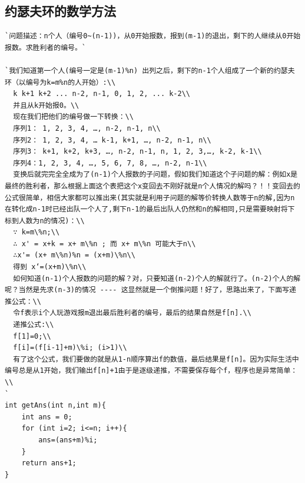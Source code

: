 \documentclass[a4paper]{article}
\begin{document}
\begin{CJK*}{UTF8}{gbsn}
\begin{multicols}{3}
\begin{flushleft}
\subsection{约瑟夫环的数学方法}
\begin{lstlisting}
`问题描述：n个人（编号0~(n-1))，从0开始报数，报到(m-1)的退出，剩下的人继续从0开始报数。求胜利者的编号。`

`我们知道第一个人(编号一定是(m-1)%n) 出列之后，剩下的n-1个人组成了一个新的约瑟夫环（以编号为k=m%n的人开始）:\\
  k k+1 k+2 ... n-2, n-1, 0, 1, 2, ... k-2\\
  并且从k开始报0。\\
  现在我们把他们的编号做一下转换：\\
  序列1： 1, 2, 3, 4, …, n-2, n-1, n\\
  序列2： 1, 2, 3, 4, … k-1, k+1, …, n-2, n-1, n\\
  序列3： k+1, k+2, k+3, …, n-2, n-1, n, 1, 2, 3,…, k-2, k-1\\
  序列4：1, 2, 3, 4, …, 5, 6, 7, 8, …, n-2, n-1\\
  变换后就完完全全成为了(n-1)个人报数的子问题，假如我们知道这个子问题的解：例如x是最终的胜利者，那么根据上面这个表把这个x变回去不刚好就是n个人情况的解吗？！！变回去的公式很简单，相信大家都可以推出来(其实就是利用子问题的解等价转换人数等于n的解,因为n在转化成n-1时已经出队一个人了,剩下n-1的最后出队人仍然和n的解相同,只是需要映射将下标到人数为n的情况)：\\
  ∵ k=m\%n;\\
  ∴ x' = x+k = x+ m\%n ; 而 x+ m\%n 可能大于n\\
  ∴x'= (x+ m\%n)%n = (x+m)\%n\\
  得到 x‘=(x+m)\%n\\
  如何知道(n-1)个人报数的问题的解？对，只要知道(n-2)个人的解就行了。(n-2)个人的解呢？当然是先求(n-3)的情况 ---- 这显然就是一个倒推问题！好了，思路出来了，下面写递推公式：\\
  令f表示i个人玩游戏报m退出最后胜利者的编号，最后的结果自然是f[n].\\
  递推公式:\\
  f[1]=0;\\
  f[i]=(f[i-1]+m)\%i; (i>1)\\
  有了这个公式，我们要做的就是从1-n顺序算出f的数值，最后结果是f[n]。因为实际生活中编号总是从1开始，我们输出f[n]+1由于是逐级递推，不需要保存每个f，程序也是异常简单：\\
`
int getAns(int n,int m){
    int ans = 0;
    for (int i=2; i<=n; i++){
        ans=(ans+m)%i;
    }
    return ans+1;
}
\end{lstlisting}


\end{flushleft}
\end{multicols}
\end{CJK*}
\end{document}

